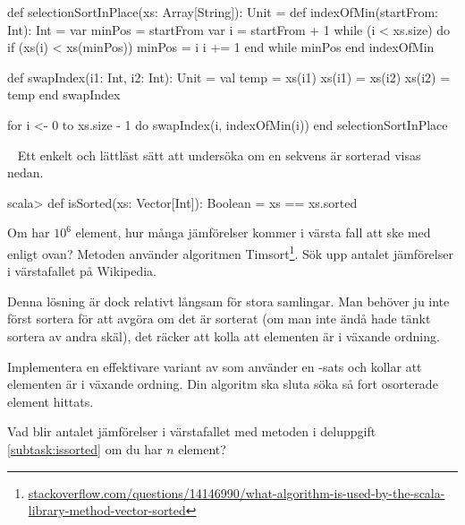 \TaskSolved \what


\begin{Code}
def selectionSortInPlace(xs: Array[String]): Unit = 
  def indexOfMin(startFrom: Int): Int = 
    var minPos = startFrom
    var i = startFrom + 1
    while (i < xs.size) do
      if (xs(i) < xs(minPos)) minPos = i
      i += 1
    end while
    minPos
  end indexOfMin

  def swapIndex(i1: Int, i2: Int): Unit = 
    val temp = xs(i1)
    xs(i1) = xs(i2)
    xs(i2) = temp
  end swapIndex  

  for i <- 0 to xs.size - 1 do swapIndex(i, indexOfMin(i))
end selectionSortInPlace
\end{Code}


\QUESTEND


\clearpage






\QUESTBEGIN

\Task \label{task:isSorted} \what~   Ett enkelt och lättläst sätt att undersöka om en sekvens är sorterad visas nedan.
\begin{REPL}
scala> def isSorted(xs: Vector[Int]): Boolean = xs == xs.sorted
\end{REPL}


\Subtask\Pen  Om  har $10^6$ element, hur många jämförelser kommer i värsta fall att ske med  enligt ovan? Metoden  använder algoritmen Timsort\footnote{\href{http://stackoverflow.com/questions/14146990/what-algorithm-is-used-by-the-scala-library-method-vector-sorted}{stackoverflow.com/questions/14146990/what-algorithm-is-used-by-the-scala-library-method-vector-sorted}}. Sök upp antalet jämförelser i värstafallet på Wikipedia.

Denna lösning är dock relativt långsam för stora samlingar. Man behöver ju inte först sortera  för att avgöra om det är sorterat (om man inte ändå hade tänkt sortera av andra skäl), det räcker att kolla att elementen är i växande ordning.

\Subtask\label{subtask:issorted} Implementera en effektivare variant av  som använder en -sats och kollar att elementen är i växande ordning. Din algoritm ska sluta söka så fort osorterade element hittats.

\Subtask\Pen Vad blir antalet jämförelser i värstafallet med metoden i deluppgift \ref{subtask:issorted} om du har $n$ element?


